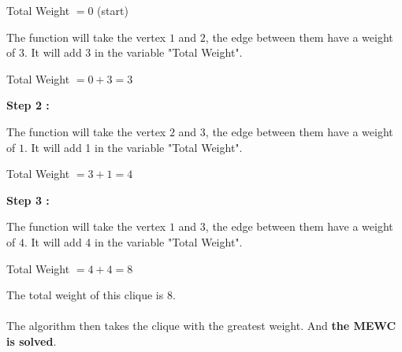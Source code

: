 \begin{center}
    Total Weight $= 0$ (start)
\end{center}

\begin{minipage}{0.4\textwidth}
\end{minipage}
\begin{minipage}{0.6\textwidth}
    The function will take the vertex $1$ and $2$, the edge between them have a weight of $3$. It will add 3 in the variable "Total Weight".
\end{minipage}
\begin{center}
    Total Weight $= 0 + 3 = 3$
\end{center}

\hspace*{1cm}  \textbf{Step 2 :}
\\
\begin{minipage}{0.4\textwidth}
\end{minipage}
\begin{minipage}{0.6\textwidth}
    The function will take the vertex $2$ and $3$, the edge between them have a weight of $1$. It will add 1 in the variable "Total Weight".
\end{minipage}
\begin{center}
    Total Weight $= 3 + 1 = 4$
\end{center}

\hspace*{1cm}  \textbf{Step 3 :}
\\
\begin{minipage}{0.4\textwidth}
\end{minipage}
\begin{minipage}{0.6\textwidth}
    The function will take the vertex $1$ and $3$, the edge between them have a weight of $4$. It will add 4 in the variable "Total Weight".
\end{minipage}
\begin{center}
    Total Weight $= 4 + 4 = 8$
\end{center}

The total weight of this clique is 8.
\\ \\
The algorithm then takes the clique with the greatest weight. And \textbf{the MEWC is solved}.
